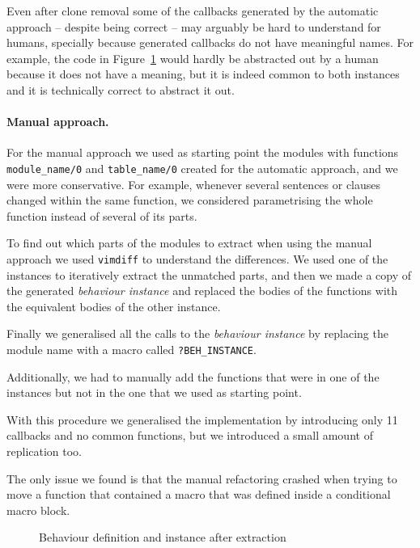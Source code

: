 Even after clone removal some of the callbacks generated by the automatic 
approach -- despite being correct -- may arguably be hard to understand for 
humans, specially because generated callbacks do not have meaningful names. For 
example, the code in Figure~\ref{fig:auto-abs} would hardly be abstracted out 
by 
a human because it does not have a meaning, but it is indeed common to both 
instances and it is technically correct to abstract it out.

\paragraph{Manual approach.}

For the manual approach we used as starting point the modules with functions 
\texttt{module\_name/0} and \texttt{table\_name/0} created for the automatic 
approach, and we were more conservative. For example, whenever several 
sentences 
or clauses changed within the same function, we considered parametrising the 
whole function instead of several of its parts.

To find out which parts of the modules to extract when using the manual 
approach we used \texttt{vimdiff} to understand the differences. We used one of 
the instances to iteratively extract the unmatched parts, and then we made a 
copy of the generated \emph{behaviour instance} and replaced the bodies of the 
functions with the equivalent bodies of the other instance.

Finally we generalised all the calls to the \emph{behaviour instance} by 
replacing the module name with a macro called \texttt{?BEH\_INSTANCE}.

Additionally, we had to manually add the functions that were in one of the 
instances but not in the one that we used as starting point.

With this procedure we generalised the implementation by introducing only 11 
callbacks and no common functions, but we introduced a small amount of 
replication too.

The only issue we found is that the manual refactoring crashed when trying to 
move a function that contained a macro that was defined inside a conditional 
macro block.

\begin{figure}[t]
%
\vspace*{-2.5mm}
\caption{Behaviour definition and instance after extraction\label{fig:auto-abs}}
\end{figure}

